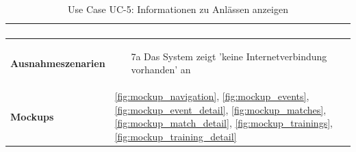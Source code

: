 \begin{table}[ht]
\begin{tabular}{ l | p{10cm} }
\begin{enumerate}
					\end{enumerate}
					\\ \hline
	\textbf{Ausnahmeszenarien}&	\begin{enumerate}
					\item[7a] Das System zeigt 'keine Internetverbindung vorhanden' an
					\end{enumerate}
					\\ \hline
	\textbf{Mockups}	 	&	\ref{fig:mockup_navigation}, \ref{fig:mockup_events}, \ref{fig:mockup_event_detail},
					\ref{fig:mockup_matches}, \ref{fig:mockup_match_detail}, \ref{fig:mockup_trainings}, 
					\ref{fig:mockup_training_detail}
  \end{tabular}
   \caption{Use Case UC-5: Informationen zu Anlässen anzeigen}\label{table:use_case_5}
\end{table}


